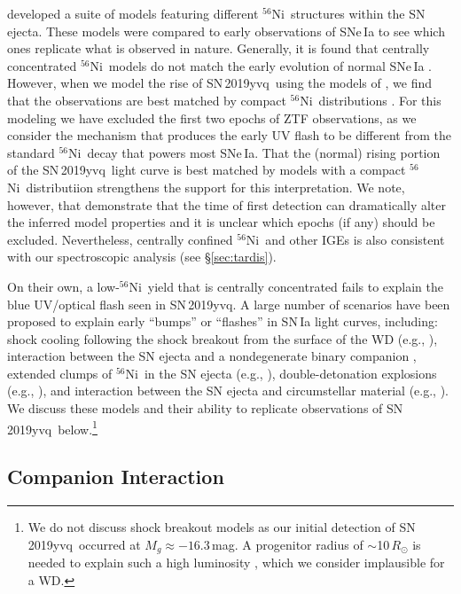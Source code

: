 \documentclass[twocolumn]{aastex63}
\newcommand{\radni}{$^{56}$Ni}
\newcommand{\sn}{SN\,2019yvq}
\begin{document}
\citet{Magee20} developed a suite of models featuring different \radni\
structures within the SN ejecta. These models were compared to early
observations of SNe\,Ia to see which ones replicate what is observed in
nature. Generally, it is found that centrally concentrated \radni\ models do
not match the early evolution of normal SNe\,Ia \citep{Magee20}. However, when
we model the rise of \sn\ using the models of \citet{Magee20}, we find that
the observations are best matched by compact \radni\ distributions \citep[the
\texttt{EXP\_Ni0.4\_KE1.40\_P21} model from][provides the best match to
\sn]{Magee20}. For this modeling we have excluded the first two epochs of ZTF
observations, as we consider the mechanism that produces the early UV flash to
be different from the standard \radni\ decay that powers most SNe\,Ia. That
the (normal) rising portion of the \sn\ light curve is best matched by models
with a compact \radni\ distributiion strengthens the support for this
interpretation. We note, however, that \citet{Magee20} demonstrate that the
time of first detection can dramatically alter the inferred model properties
and it is unclear which epochs (if any) should be excluded. Nevertheless,
centrally confined \radni\ and other IGEs is also consistent with our
spectroscopic analysis (see \S\ref{sec:tardis}).

On their own, a low-\radni\ yield that is centrally concentrated fails to
explain the blue UV/optical flash seen in \sn. A large number of scenarios
have been proposed to explain early ``bumps'' or ``flashes'' in SN\,Ia light
curves, including: shock cooling following the shock breakout from the surface
of the WD (e.g., \citealt{Piro10,Rabinak11}), interaction between the SN
ejecta and a nondegenerate binary companion \citep{Kasen10a}, extended clumps
of \radni\ in the SN ejecta (e.g., \citealt{Shappee19,Dimitriadis19}),
double-detonation explosions (e.g., \citealt{Noebauer17,Polin19}), and
interaction between the SN ejecta and circumstellar material (e.g.,
\citealt{Dessart14,Piro16,Levanon17}). We discuss these models and their
ability to replicate observations of \sn\ below.\footnote{We do not discuss
shock breakout models as our initial detection of \sn\ occurred at $M_g
\approx -16.3$\,mag. A progenitor radius of $\sim$10$\,R_\odot$ is needed to
explain such a high luminosity \citep{Piro10,Rabinak11}, which we consider
implausible for a WD.}

\subsection{Companion Interaction}\label{sec:companion_interaction}
\end{document}
